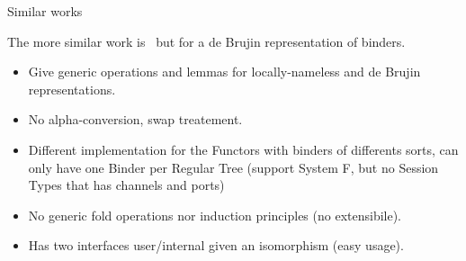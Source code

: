 \documentclass{beamer}
\begin{document}
\begin{frame}{Similar works}
  
  The more similar work is~\cite{Lee2012} but for a de Brujin representation of binders.

  \begin{itemize}
  \item Give generic operations and lemmas for locally-nameless and de Brujin representations.
  \item No alpha-conversion, swap treatement.
  \item Different implementation for the Functors with binders of differents sorts, can only have one Binder per Regular Tree (support System F, but no Session Types that has channels and ports)
  \item No generic fold operations nor induction principles (no extensibile).
  \item Has two interfaces user/internal given an isomorphism (easy usage).
  \end{itemize}
  
\end{frame}


\end{document}
